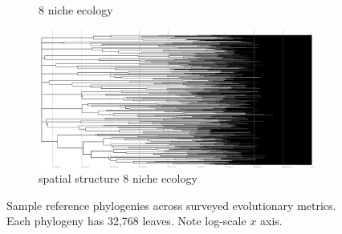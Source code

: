 \begin{figure}
\begin{subfigure}[b]{1\columnwidth}
    \caption{%
      8 niche ecology}
  \end{subfigure}
  \hfill
  \begin{subfigure}[b]{1\columnwidth}
    \includegraphics[height=0.12\textheight,width=\textwidth]{img/perfect-tree-phylogenies-log/epoch=7+resolution=3+treatment=18/a=collapsed-phylogeny+epoch=00007+mut_distn=np.random.standard_normal+num_generations=32768+num_islands=1024+num_niches=8+p_island_migration=0.01+p_niche_invasion=3.0517578125e-08+population_size=3276.../8+replicate=0+tournament_size=2+treatment=18+_generation=262144+_index=18+scale=log+ext=.pdf}
    \caption{%
      spatial structure 8 niche ecology}
  \end{subfigure}
  \hfill
  \caption{%
    Sample reference phylogenies across surveyed evolutionary metrics.
    Each phylogeny has 32,768 leaves.
    Note log-scale $x$ axis.
  }
  \label{fig:perfect-tree-phylogenies-log}
\end{figure}


